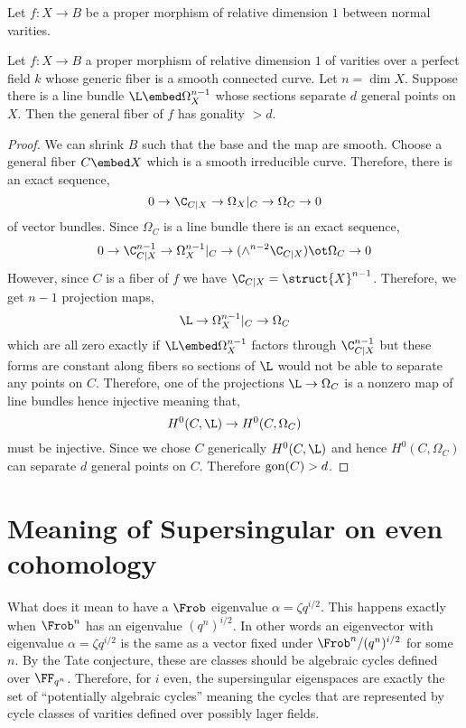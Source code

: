 \documentclass[12pt]{article}
\begin{document}
\begin{lemma}
Let $f : X \to B$ be a proper morphism of relative dimension $1$ between normal varities.
\end{lemma}

\begin{lemma}
Let $f : X \to B$ a proper morphism of relative dimension $1$ of varities over a perfect field $k$ whose generic fiber is a smooth connected curve. Let $n = \dim{X}$. Suppose there is a line bundle $\L \embed \Omega_X^{n-1}$ whose sections separate $d$ general points on $X$. Then the general fiber of $f$ has gonality $> d$.
\end{lemma}

\begin{proof}
We can shrink $B$ such that the base and the map are smooth. Choose a general fiber $C \embed X$ which is a smooth irreducible curve. Therefore, there is an exact sequence,
\[ 0 \to \C_{C|X} \to \Omega_{X}|_C \to \Omega_C \to 0 \]
of vector bundles. Since $\Omega_C$ is a line bundle there is an exact sequence,
\[ 0 \to \C_{C|X}^{n-1} \to \Omega^{n-1}_X|_C \to (\wedge^{n-2} \C_{C|X}) \ot \Omega_C \to 0 \]
However, since $C$ is a fiber of $f$ we have $\C_{C|X} = \struct{X}^{n-1}$. Therefore, we get $n-1$ projection maps,
\[ \L \to \Omega_X^{n-1}|_C \to \Omega_C \]
which are all zero exactly if $\L \embed \Omega_X^{n-1}$ factors through $\C_{C|X}^{n-1}$ but these forms are constant along fibers so sections of $\L$ would not be able to separate any points on $C$. Therefore, one of the projections $\L \to \Omega_C$ is a nonzero map of line bundles hence injective meaning that,
\[ H^0(C, \L) \to H^0(C, \Omega_C) \]
must be injective. Since we chose $C$ generically $H^0(C, \L)$ and hence $H^0(C, \Omega_C)$ can separate $d$ general points on $C$. Therefore $\mathrm{gon}(C) > d$. 
\end{proof}

\newpage 

\section{Meaning of Supersingular  on even cohomology}

What does it mean to have a $\Frob$ eigenvalue $\alpha = \zeta q^{i/2}$. This happens exactly when $\Frob^n$ has an eigenvalue $(q^n)^{i/2}$. In other words an eigenvector with eigenvalue $\alpha = \zeta q^{i/2}$ is the same as a vector fixed under $\Frob^n / (q^n)^{i/2}$ for some $n$. By the Tate conjecture, these are classes should be algebraic cycles defined over $\FF_{q^n}$. Therefore, for $i$ even, the supersingular eigenspaces are exactly the set of ``potentially algebraic cycles'' meaning the cycles that are represented by cycle classes of varities defined over possibly lager fields. 
\end{document}
